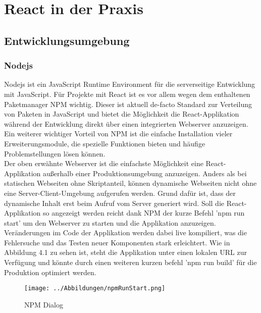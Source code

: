 
\chapter{React in der Praxis}
  \label{React in der Praxis}
\section{Entwicklungsumgebung}
\subsection{Nodejs}
Nodejs ist ein JavaScript Runtime Environment für die serverseitige Entwicklung mit JavaScript. Für Projekte mit React ist es vor allem wegen dem enthaltenen Paketmanager NPM wichtig. Dieser ist aktuell de-facto Standard zur Verteilung von Paketen in JavaScript und bietet die Möglichkeit die React-Applikation während der Entwicklung direkt über einen integrierten Webserver anzuzeigen. Ein weiterer wichtiger Vorteil von NPM ist die einfache Installation vieler Erweiterungsmodule, die spezielle Funktionen bieten und häufige Problemstellungen lösen können. \\
Der oben erwähnte Webserver ist die einfachste Möglichkeit eine React-Applikation außerhalb einer Produktionsumgebung anzuzeigen. Anders als bei statischen Webseiten ohne Skriptanteil, können dynamische Webseiten nicht ohne eine Server-Client-Umgebung aufgerufen werden. Grund dafür ist, dass der dynamische Inhalt erst beim Aufruf vom Server generiert wird. Soll die React-Applikation so angezeigt werden reicht dank NPM der kurze Befehl 'npm run start' um den Webserver zu starten und die Applikation anzuzeigen. Veränderungen im Code der Applikation werden dabei live kompiliert, was die Fehlersuche und das Testen neuer Komponenten stark erleichtert. Wie in Abbildung 4.1 zu sehen ist, steht die Applikation unter einen lokalen URL zur Verfügung und könnte durch einen weiteren kurzen befehl 'npm run build' für die Produktion optimiert werden.
\begin{figure}[H]
     \centerline{\texttt{[image: ../Abbildungen/npmRunStart.png]}}
  \caption{NPM Dialog}
  \label{NPM Dialog}
\end{figure}
